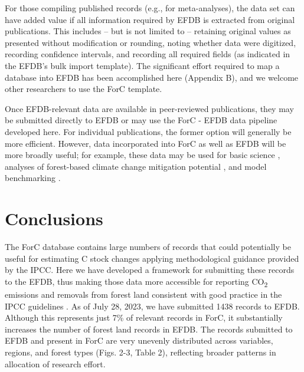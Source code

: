\documentclass[, manuscript]{copernicus}
\begin{document}
For those compiling published records (e.g., for meta-analyses), the
data set can have added value if all information required by EFDB is
extracted from original publications. This includes -- but is not
limited to -- retaining original values as presented without
modification or rounding, noting whether data were digitized, recording
confidence intervals, and recording all required fields (as indicated in
the EFDB's bulk import template). The significant effort required to map
a database into EFDB has been accomplished here (Appendix B), and we
welcome other researchers to use the ForC template.

Once EFDB-relevant data are available in peer-reviewed publications,
they may be submitted directly to EFDB or may use the ForC - EFDB data
pipeline developed here. For individual publications, the former option
will generally be more efficient. However, data incorporated into ForC
as well as EFDB will be more broadly useful; for example, these data may
be used for basic science
\citep[e.g.,][]{banburymorgan_global_2021, anderson-teixeira_carbon_2021},
analyses of forest-based climate change mitigation potential
\citep[e.g.,][]{cook-patton_mapping_2020, goldstein_protecting_2020},
and model benchmarking \citep{fer_ecosystem_2021}.

\section{Conclusions}

The ForC database contains large numbers of records that could
potentially be useful for estimating C stock changes applying
methodological guidance provided by the IPCC. Here we have developed a
framework for submitting these records to the EFDB, thus making those
data more accessible for reporting CO\textsubscript{2} emissions and
removals from forest land consistent with good practice in the IPCC
guidelines \citep{ipcc_2006_2006, ipcc_2019_2019}. As of July 28, 2023,
we have submitted 1438 records to EFDB. Although this represents just
7\% of relevant records in ForC, it substantially increases the number
of forest land records in EFDB. The records submitted to EFDB and
present in ForC are very unevenly distributed across variables, regions,
and forest types (Figs. 2-3, Table 2), reflecting broader patterns in
allocation of research effort.
\end{document}
